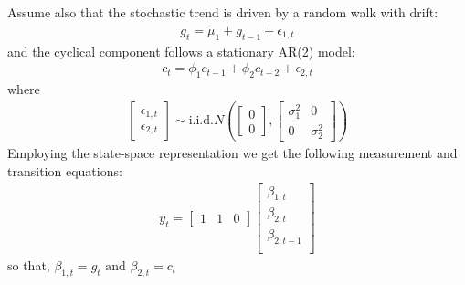 \documentclass[10pt]{article}
\begin{document}
Assume also that the stochastic trend is driven by a random walk with drift: 
\begin{gather*}
    g_t = \tilde{\mu}_1 + g_{t - 1} + \epsilon_{1, t}
\end{gather*}
and the cyclical component follows a stationary AR(2) model: 
\begin{gather*}
    c_t = \phi_1c_{t - 1} + \phi_2c_{t - 2} + \epsilon_{2, t}
\end{gather*}
where 
\begin{gather}
    \begin{bmatrix}
        \epsilon_{1, t}\\
        \epsilon_{2, t}
    \end{bmatrix}
    \sim \text{i.i.d.} N \left(
        \begin{bmatrix}
            0 \\ 0
        \end{bmatrix},
        \begin{bmatrix}
            \sigma^2_1 & 0 \\ 
            0 & \sigma^2_2
        \end{bmatrix}
    \right)
\end{gather}
\newpage 
Employing the state-space representation we get the following measurement and transition equations:
\begin{gather*}
    y_t = 
    \begin{bmatrix}
        1 & 1 & 0
    \end{bmatrix}
    \begin{bmatrix}
        \beta_{1, t}\\
        \beta_{2, t}\\
        \beta_{2, t - 1}\\
    \end{bmatrix}
\end{gather*}
so that, $\beta_{1, t} = g_t \text{ and }\beta_{2, t} = c_t $
\end{document}
